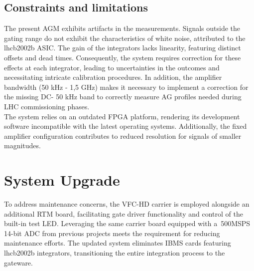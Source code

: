 \subsection{Constraints and limitations}
The present AGM exhibits artifacts in the measurements. Signals outside the gating range do not exhibit the characteristics of white noise, attributed to the lhcb2002b ASIC. The gain of the integrators lacks linearity, featuring distinct offsets and dead times. Consequently, the system requires correction for these effects at each integrator, leading to uncertainties in the outcomes and necessitating intricate calibration procedures. In addition, the amplifier bandwidth (50 kHz - 1,5 GHz) makes it necessary to implement a correction for the missing DC- 50 kHz band to correctly measure AG profiles needed during LHC commissioning phases.\\
The system relies on an outdated FPGA platform, rendering its development
software incompatible with the latest operating systems. Additionally, the
fixed amplifier configuration contributes to reduced resolution for signals of
smaller magnitudes.

\section{System Upgrade}
To address maintenance concerns, the VFC-HD carrier is employed alongside an
additional RTM board, facilitating gate driver functionality and control of the
built-in test LED. Leveraging the same carrier board equipped with a~500MSPS
14-bit ADC from previous projects meets the requirement for reducing
maintenance efforts. The updated system eliminates IBMS cards featuring
lhcb2002b integrators, transitioning the entire integration process to the
gateware.

